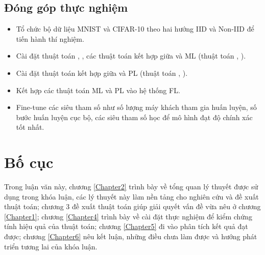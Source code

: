 \subsection{Đóng góp thực nghiệm}

\begin{itemize}
    \item Tổ chức bộ dữ liệu MNIST và CIFAR-10 theo hai hướng IID và Non-IID để tiến hành thí nghiệm.
    \item Cài đặt thuật toán , , các thuật toán kết hợp giữa  và ML (thuật toán , ).
    \item Cài đặt thuật toán kết hợp giữa  và PL (thuật toán , ).
    \item Kết hợp các thuật toán ML và PL vào hệ thống FL.
    \item Fine-tune các siêu tham số như số lượng máy khách tham gia huấn luyện, số bước huấn luyện cục bộ, các siêu tham số học để mô hình đạt độ chính xác tốt nhất.
\end{itemize}

\section{Bố cục}

Trong luận văn này, chương \ref{Chapter2} trình bày về tổng quan lý thuyết được sử dụng trong khóa luận, các lý thuyết này làm nền tảng cho nghiên cứu và đề xuất thuật toán; chương 3 đề xuất thuật toán giúp giải quyết vấn đề vừa nêu ở chương \ref{Chapter1}; chương \ref{Chapter4} trình bày về cài đặt thực nghiệm để kiểm chứng tính hiệu quả của thuật toán; chương \ref{Chapter5} đi vào phân tích kết quả đạt được; chương \ref{Chapter6} nêu kết luận, những điều chưa làm được và hướng phát triển tương lai của khóa luận.
